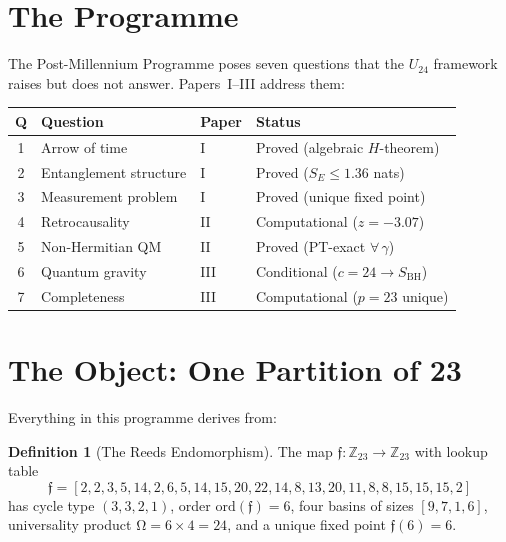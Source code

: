 \documentclass[12pt,a4paper]{article}
\theoremstyle{definition}\newtheorem{definition}[theorem]{Definition}
\theoremstyle{remark}\newtheorem{remark}[theorem]{Remark}
\renewcommand{\O}{\mathrm{\Omega}}
\newcommand{\Reeds}{\mathfrak{f}}\newcommand{\Zp}{\mathbb{Z}_{23}}
\begin{document}
\tableofcontents
\newpage

\section{The Programme}
\label{sec:programme}

The Post-Millennium Programme poses seven questions that the $U_{24}$ framework
\cite{dwr2026} raises but does not answer. Papers~I--III \cite{paper1, paper2,
paper3} address them:

\begin{center}
\begin{tabular}{clll}
\toprule
\textbf{Q} & \textbf{Question} & \textbf{Paper} & \textbf{Status} \\
\midrule
1 & Arrow of time & I & Proved (algebraic $H$-theorem) \\
2 & Entanglement structure & I & Proved ($S_E \leq 1.36$ nats) \\
3 & Measurement problem & I & Proved (unique fixed point) \\
4 & Retrocausality & II & Computational ($z = -3.07$) \\
5 & Non-Hermitian QM & II & Proved (PT-exact $\forall\,\gamma$) \\
6 & Quantum gravity & III & Conditional ($c = 24 \to S_{\mathrm{BH}}$) \\
7 & Completeness & III & Computational ($p = 23$ unique) \\
\bottomrule
\end{tabular}
\end{center}

\section{The Object: One Partition of 23}
\label{sec:object}

Everything in this programme derives from:

\begin{definition}[The Reeds Endomorphism]
The map $\Reeds: \Zp \to \Zp$ with lookup table
\begin{equation}
  \Reeds = [2, 2, 3, 5, 14, 2, 6, 5, 14, 15, 20, 22, 14, 8, 13, 20, 11, 8, 8, 15, 15, 15, 2]
\end{equation}
has cycle type $(3,3,2,1)$, order $\mathrm{ord}(\Reeds) = 6$, four basins of
sizes $[9, 7, 1, 6]$, universality product $\O = 6 \times 4 = 24$, and a
unique fixed point $\Reeds(6) = 6$.
\end{definition}
\end{document}
